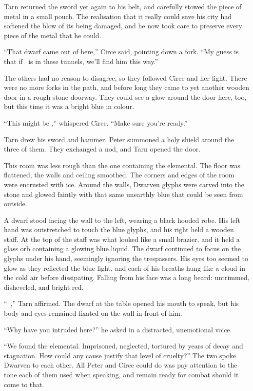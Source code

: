 Tarn returned the sword yet again to his belt, and carefully stowed the piece of metal in a small pouch.  The realisation that it really could save his city had softened the blow of its being damaged, and he now took care to preserve every piece of the metal that he could.

``That dwarf came out of here,'' Circe said, pointing down a fork.  ``My guess is that if \mothzam\ is in these tunnels, we'll find him this way.''

The others had no reason to disagree, so they followed Circe and her light.  There were no more forks in the path, and before long they came to yet another wooden door in a rough stone doorway.  They could see a glow around the door here, too, but this time it was a bright blue in colour.

``This might be \mothzam,'' whispered Circe.  ``Make sure you're ready.''

Tarn drew his sword and hammer.  Peter summoned a holy shield around the three of them.  They exchanged a nod, and Tarn opened the door.

This room was less rough than the one containing the elemental.  The floor was flattened, the walls and ceiling smoothed.  The corners and edges of the room were encrusted with ice.  Around the walls, Dwarven glyphs were carved into the stone and glowed faintly with that same unearthly blue that could be seen from outside.

A dwarf stood facing the wall to the left, wearing a black hooded robe.  His left hand was outstretched to touch the blue glyphs, and his right held a wooden staff.  At the top of the staff was what looked like a small brazier, and it held a glass orb containing a glowing blue liquid.  The dwarf continued to focus on the glyphs under his hand, seemingly ignoring the trespassers.  His eyes too seemed to glow as they reflected the blue light, and each of his breaths hung like a cloud in the cold air before dissipating.  Falling from his face was a long beard: untrimmed, disheveled, and bright red.

``\mothzam\ \driktur,'' Tarn affirmed.  The dwarf at the table opened his mouth to speak, but his body and eyes remained fixated on the wall in front of him.

``Why have you intruded here?'' he asked in a distracted, unemotional voice.

``We found the elemental.  Imprisoned, neglected, tortured by years of decay and stagnation.  How could any cause justify that level of cruelty?''  The two spoke Dwarven to each other.  All Peter and Circe could do was pay attention to the tone each of them used when speaking, and remain ready for combat should it come to that.

